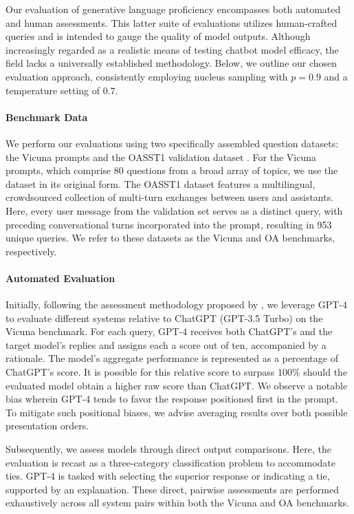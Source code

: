 Our evaluation of generative language proficiency encompasses both automated and human assessments. This latter suite of evaluations utilizes human-crafted queries and is intended to gauge the quality of model outputs. Although increasingly regarded as a realistic means of testing chatbot model efficacy, the field lacks a universally established methodology. Below, we outline our chosen evaluation approach, consistently employing nucleus sampling with $p=0.9$ and a temperature setting of $0.7$.

\paragraph{Benchmark Data} We perform our evaluations using two specifically assembled question datasets: the Vicuna prompts \citep{vicuna2023} and the OASST1 validation dataset \citep{kopf2023openassistant}. For the Vicuna prompts, which comprise 80 questions from a broad array of topics, we use the dataset in its original form. The OASST1 dataset features a multilingual, crowdsourced collection of multi-turn exchanges between users and assistants. Here, every user message from the validation set serves as a distinct query, with preceding conversational turns incorporated into the prompt, resulting in 953 unique queries. We refer to these datasets as the Vicuna and OA benchmarks, respectively.

\paragraph{Automated Evaluation} Initially, following the assessment methodology proposed by \citet{vicuna2023}, we leverage GPT-4 to evaluate different systems relative to ChatGPT (GPT-3.5 Turbo) on the Vicuna benchmark. For each query, GPT-4 receives both ChatGPT's and the target model's replies and assigns each a score out of ten, accompanied by a rationale. The model's aggregate performance is represented as a percentage of ChatGPT’s score. It is possible for this relative score to surpass 100\% should the evaluated model obtain a higher raw score than ChatGPT. We observe a notable bias wherein GPT-4 tends to favor the response positioned first in the prompt. To mitigate such positional biases, we advise averaging results over both possible presentation orders.

Subsequently, we assess models through direct output comparisons. Here, the evaluation is recast as a three-category classification problem to accommodate ties. GPT-4 is tasked with selecting the superior response or indicating a tie, supported by an explanation. These direct, pairwise assessments are performed exhaustively across all system pairs within both the Vicuna and OA benchmarks.

